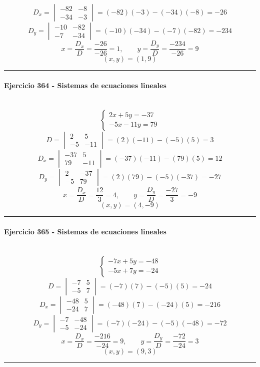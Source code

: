 \documentclass[10pt,a4paper]{article}
\newcommand{\res}[1]{\paragraph{#1}\mbox{}\\[-1.2em]}
\begin{document}
\[ D_x=\begin{vmatrix}-82&-8\\-34&-3\end{vmatrix}=(-82)(-3)-(-34)(-8)=-26 \]
\[ D_y=\begin{vmatrix}-10&-82\\-7&-34\end{vmatrix}=(-10)(-34)-(-7)(-82)=-234 \]
\[ x=\frac{D_x}{D}=\frac{-26}{-26}=1,\qquad y=\frac{D_y}{D}=\frac{-234}{-26}=9 \]
\[ \boxed{(x,y)=(1,9)} \]
\vspace{1mm}\hrule\vspace{2mm}
\res{Ejercicio 364 - Sistemas de ecuaciones lineales}
\[ \begin{cases}2 x + 5 y=-37\\- 5 x - 11 y=79\end{cases} \]
\[ D=\begin{vmatrix}2&5\\-5&-11\end{vmatrix}=(2)(-11)-(-5)(5)=3 \]
\[ D_x=\begin{vmatrix}-37&5\\79&-11\end{vmatrix}=(-37)(-11)-(79)(5)=12 \]
\[ D_y=\begin{vmatrix}2&-37\\-5&79\end{vmatrix}=(2)(79)-(-5)(-37)=-27 \]
\[ x=\frac{D_x}{D}=\frac{12}{3}=4,\qquad y=\frac{D_y}{D}=\frac{-27}{3}=-9 \]
\[ \boxed{(x,y)=(4,-9)} \]
\vspace{1mm}\hrule\vspace{2mm}
\res{Ejercicio 365 - Sistemas de ecuaciones lineales}
\[ \begin{cases}- 7 x + 5 y=-48\\- 5 x + 7 y=-24\end{cases} \]
\[ D=\begin{vmatrix}-7&5\\-5&7\end{vmatrix}=(-7)(7)-(-5)(5)=-24 \]
\[ D_x=\begin{vmatrix}-48&5\\-24&7\end{vmatrix}=(-48)(7)-(-24)(5)=-216 \]
\[ D_y=\begin{vmatrix}-7&-48\\-5&-24\end{vmatrix}=(-7)(-24)-(-5)(-48)=-72 \]
\[ x=\frac{D_x}{D}=\frac{-216}{-24}=9,\qquad y=\frac{D_y}{D}=\frac{-72}{-24}=3 \]
\[ \boxed{(x,y)=(9,3)} \]
\vspace{1mm}\hrule\vspace{2mm}
\end{document}
